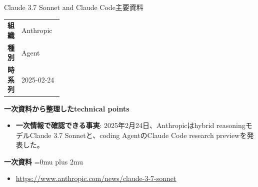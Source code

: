 \begin{technicalnote}{Claude 3.7 Sonnet and Claude Code}{主要資料}
\begingroup
\begin{tabularx}{\linewidth}{@{}>{\bfseries}p{0.22\linewidth}X@{}}
組織 & Anthropic \\
種別 & Agent \\
時系列 & 2025-02-24 \\
\end{tabularx}
\smallskip
\begin{minipage}{\linewidth}
{\bfseries 一次資料から整理したtechnical points}
\begin{itemize}[leftmargin=1.5em,itemsep=0.35em]
\item \textbf{一次情報で確認できる事実}: 2025年2月24日、Anthropicはhybrid reasoningモデルClaude 3.7 Sonnetと、coding AgentのClaude Code research previewを発表した。
\end{itemize}
\begin{samepage}
{\bfseries 一次資料}
\begingroup\sloppy
\Urlmuskip=0mu plus 2mu\relax
\begin{itemize}[leftmargin=1.5em,itemsep=0.25em]
\item {\scriptsize\url{https://www.anthropic.com/news/claude-3-7-sonnet}}
\end{itemize}
\endgroup
\end{samepage}
\end{minipage}
\endgroup
\end{technicalnote}
\medskip

